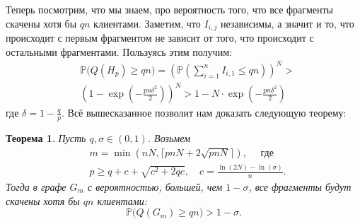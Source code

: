 \documentclass{matmex-diploma-custom}
\newcommand{\PRob}{\mathbb P}
\newcommand{\leqs}{\leqslant}
\newcommand{\geqs}{\geqslant}
\newtheorem{theorem}{Теорема}
\theoremstyle{named}
\begin{document}
Теперь посмотрим, что мы знаем, про вероятность того, что все фрагменты скачены хотя бы $qn$ клиентами.
Заметим, что $I_{i,j}$ независимы, а значит и то, что происходит с первым фрагментом не зависит от того, 
что происходит с остальными фрагментами. Пользуясь этим получим:
\begin{equation}\label{mod1_pr}\begin{aligned}
&\PRob\big(Q(H_p) \geqs q n\big) = \left( \PRob\left(\sum_{i=1}^n I_{i,1} \leqs qn\right)  \right)^N >
\\
&\left( 1 - \exp\left(- \frac{pn \delta^2}{2} \right) \right)^N > 1 - N \cdot \exp\left(- \frac{pn \delta^2}{2} \right) 
\end{aligned}\end{equation}
где $\delta = 1 - \frac{q}{p}$. Всё вышесказанное позволит нам доказать следующую теорему:

\begin{theorem}\label{t1}
Пусть $q, \sigma \in (0, 1)$. Возьмем 
\begin{align}
& m = \min(nN, \lceil pnN + 2\sqrt{pnN} \rceil), \quad \text{ где} \\
& p \geqs q + c + \sqrt{c^2+2qc}, \quad c = \frac{\ln(2N) - \ln(\sigma)}{n}.
\end{align}
Тогда в графе $G_m$ с вероятностью, большей, чем $1 - \sigma$, все фрагменты будут скачены хотя бы $qn$ клиентами:
\begin{equation}
\PRob\big(Q(G_m) \geqs qn\big) > 1 - \sigma.
\end{equation}
\end{theorem}
\end{document}
